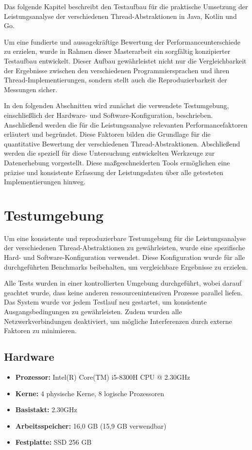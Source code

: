 \documentclass[fontsize=12pt,paper=a4,twoside=semi,parskip=half-,headsepline,headinclude]{scrreprt}
\begin{document}
Das folgende Kapitel beschreibt den Testaufbau für die praktische Umsetzung der Leistungsanalyse der verschiedenen Thread-Abstraktionen in Java, Kotlin und Go. 

Um eine fundierte und aussagekräftige Bewertung der Per\-for\-mance\-un\-ter\-schiede zu erzielen, wurde in Rahmen dieser Masterarbeit ein sorgfältig konzipierter Testaufbau entwickelt. Dieser Aufbau gewährleistet nicht nur die Vergleichbarkeit der Ergebnisse zwischen den verschiedenen Programmiersprachen und ihren Thread-Implementierungen, sondern stellt auch die Reproduzierbarkeit der Messungen sicher.

In den folgenden Abschnitten wird zunächst die verwendete Testumgebung, einschließlich der Hardware- und Software-Konfiguration, beschrieben. Anschließend werden die für die Leistungsanalyse relevanten Performancefaktoren erläutert und begründet. Diese Faktoren bilden die Grundlage für die quantitative Bewertung der verschiedenen Thread-Abstraktionen. Abschließend werden die speziell für diese Untersuchung entwickelten Werkzeuge zur Datenerhebung vorgestellt. Diese maßgeschneiderten Tools ermöglichen eine präzise und konsistente Erfassung der Leistungsdaten über alle getesteten Implementierungen hinweg.

\section{Testumgebung}

Um eine konsistente und reproduzierbare Testumgebung für die Leistungsanalyse der verschiedenen Thread-Abstraktionen zu gewährleisten, wurde eine spezifische Hard- und Software-Konfiguration verwendet. Diese Konfiguration wurde für alle durchgeführten Benchmarks beibehalten, um vergleichbare Ergebnisse zu erzielen.

Alle Tests wurden in einer kontrollierten Umgebung durchgeführt, wobei darauf geachtet wurde, dass keine anderen ressourcenintensiven Prozesse parallel liefen. Das System wurde vor jedem Testlauf neu gestartet, um konsistente Ausgangsbedingungen zu gewährleisten. Zudem wurden alle Netzwerkverbindungen deaktiviert, um mögliche Interferenzen durch externe Faktoren zu minimieren.

\subsection{Hardware}

\begin{itemize}
	\item \textbf{Prozessor:} Intel(R) Core(TM) i5-8300H CPU @ 2.30GHz
	\item[] \hspace{0.8cm}\textbf{Kerne:} 4 physische Kerne, 8 logische Prozessoren
	\item[] \hspace{0.8cm}\textbf{Basistakt:} 2.30GHz
	\item \textbf{Arbeitsspeicher:} 16,0 GB (15,9 GB verwendbar)
	\item \textbf{Festplatte:} SSD 256 GB
\end{itemize}
\end{document}
